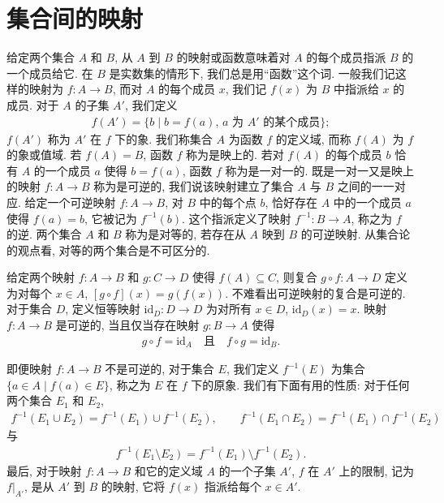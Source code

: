 \documentclass[../../main.tex]{subfiles}
\begin{document}
\section{集合间的映射}\label{section:ch00-映射}

给定两个集合 $A$ 和 $B$, 从 $A$ 到 $B$ 的映射或函数意味着对 $A$ 的每个成员指派 $B$ 的一个成员给它. 在 $B$ 是实数集的情形下, 我们总是用“函数”这个词. 一般我们记这样的映射为 $f:A\to B$, 而对 $A$ 的每个成员 $x$, 我们记 $f(x)$ 为 $B$ 中指派给 $x$ 的成员. 对于 $A$ 的子集 $A'$, 我们定义
\begin{align*}
f(A')=\{b\mid b=f(a),\,a\text{ 为 }A'\text{ 的某个成员}\};
\end{align*}
$f(A')$ 称为 $A'$ 在 $f$ 下的象. 我们称集合 $A$ 为函数 $f$ 的定义域, 而称 $f(A)$ 为 $f$ 的象或值域. 若 $f(A)=B$, 函数 $f$ 称为是映上的. 若对 $f(A)$ 的每个成员 $b$ 恰有 $A$ 的一个成员 $a$ 使得 $b=f(a)$, 函数 $f$ 称为是一对一的. 既是一对一又是映上的映射 $f:A\to B$ 称为是可逆的, 我们说该映射建立了集合 $A$ 与 $B$ 之间的一一对应. 给定一个可逆映射 $f:A\to B$, 对 $B$ 中的每个点 $b$, 恰好存在 $A$ 中的一个成员 $a$ 使得 $f(a)=b$, 它被记为 $f^{-1}(b)$. 这个指派定义了映射 $f^{-1}:B\to A$, 称之为 $f$ 的逆. 两个集合 $A$ 和 $B$ 称为是对等的, 若存在从 $A$ 映到 $B$ 的可逆映射. 从集合论的观点看, 对等的两个集合是不可区分的.

给定两个映射 $f:A\to B$ 和 $g:C\to D$ 使得 $f(A)\subseteq C$, 则复合 $g\circ f:A\to D$ 定义为对每个 $x\in A$, $[g\circ f](x)=g(f(x))$. 不难看出可逆映射的复合是可逆的. 对于集合 $D$, 定义恒等映射 $\mathrm{id}_{D}:D\to D$ 为对所有 $x\in D$, $\mathrm{id}_{D}(x)=x$. 映射 $f:A\to B$ 是可逆的, 当且仅当存在映射 $g:B\to A$ 使得
\begin{align*}
g\circ f=\mathrm{id}_{A}\quad\text{且}\quad f\circ g=\mathrm{id}_{B}.
\end{align*}

即便映射 $f:A\to B$ 不是可逆的, 对于集合 $E$, 我们定义 $f^{-1}(E)$ 为集合 $\{a\in A\mid f(a)\in E\}$, 称之为 $E$ 在 $f$ 下的原象. 我们有下面有用的性质: 对于任何两个集合 $E_{1}$ 和 $E_{2}$,
\begin{align*}
f^{-1}(E_{1}\cup E_{2})=f^{-1}(E_{1})\cup f^{-1}(E_{2}),\qquad
f^{-1}(E_{1}\cap E_{2})=f^{-1}(E_{1})\cap f^{-1}(E_{2})
\end{align*}
与
\begin{align*}
f^{-1}(E_{1}\setminus E_{2})=f^{-1}(E_{1})\setminus f^{-1}(E_{2}).
\end{align*}
最后, 对于映射 $f:A\to B$ 和它的定义域 $A$ 的一个子集 $A'$, $f$ 在 $A'$ 上的限制, 记为 $f|_{A'}$, 是从 $A'$ 到 $B$ 的映射, 它将 $f(x)$ 指派给每个 $x\in A'$.
\end{document}
